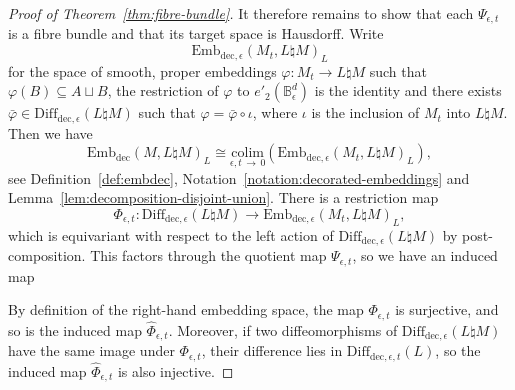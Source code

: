 \documentclass[10pt,a4paper]{amsart}
\numberwithin{equation}{section}
\newcommand{\colim}{\mathrm{colim}}
\newcommand{\rdec}{\mathrm{dec}}
\newcommand{\bB}{\mathbb{B}}
\newcommand{\too}{\ensuremath{\longrightarrow}}
\newcommand{\diffdece}{\ensuremath{\mathrm{Diff}_{\rdec,\epsilon}}}
\newcommand{\diffdecet}{\ensuremath{\mathrm{Diff}_{\rdec,\epsilon,t}}}
\newcommand{\embdec}{\ensuremath{\mathrm{Emb}_{\rdec}}}
\newcommand{\embdece}{\ensuremath{\mathrm{Emb}_{\rdec,\epsilon}}}
\theoremstyle{definition}
\theoremstyle{remark}
\begin{document}
\begin{proof}[Proof of Theorem~\ref{thm:fibre-bundle}]
It therefore remains to show that each $\Psi_{\epsilon,t}$ is a fibre bundle and that its target space is Hausdorff. Write
\[
\embdece(M_t,L\natural M)_L
\]
for the space of smooth, proper embeddings $\varphi \colon M_t \to L \natural M$ such that $\varphi(B) \subseteq A \sqcup B$, the restriction of $\varphi$ to $e'_{2}(\bB_{\epsilon}^d)$ is the identity and there exists $\bar{\varphi} \in \diffdece(L \natural M)$ such that $\varphi = \bar{\varphi} \circ \iota$, where $\iota$ is the inclusion of $M_t$ into $L\natural M$. Then we have
\begin{equation}\label{eq:emb-colimit-identification}
\embdec(M,L\natural M)_L \cong \underset{\epsilon,t\,\to\,0}{\colim} \left(\embdece(M_t,L\natural M)_L\right),
\end{equation}
see Definition~\ref{def:embdec}, Notation~\ref{notation:decorated-embeddings} and Lemma~\ref{lem:decomposition-disjoint-union}. There is a restriction map
\[
\Phi_{\epsilon,t} \colon \diffdece(L\natural M) \too \embdece(M_t,L\natural M)_L,
\]
which is equivariant with respect to the left action of $\diffdece(L\natural M)$ by post-composi\-tion. This factors through the quotient map $\Psi_{\epsilon,t}$, so we have an induced map
\begin{center}
\end{center}
By definition of the right-hand embedding space, the map $\Phi_{\epsilon,t}$ is surjective, and so is the induced map $\widehat{\Phi}_{\epsilon,t}$. Moreover, if two diffeomorphisms of $\diffdece(L\natural M)$ have the same image under $\Phi_{\epsilon,t}$, their difference lies in $\diffdecet(L)$, so the induced map $\widehat{\Phi}_{\epsilon,t}$ is also injective.


\end{proof}
\end{document}
